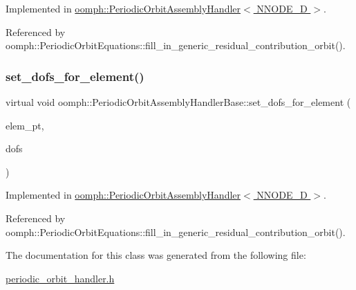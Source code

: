 Implemented in \hyperlink{classoomph_1_1PeriodicOrbitAssemblyHandler_a681a727dc0a463e924aa88e0e691e2c6}{oomph\+::\+Periodic\+Orbit\+Assembly\+Handler$<$ N\+N\+O\+D\+E\+\_\+D $>$}.



Referenced by oomph\+::\+Periodic\+Orbit\+Equations\+::fill\+\_\+in\+\_\+generic\+\_\+residual\+\_\+contribution\+\_\+orbit().

\mbox{\label{classoomph_1_1PeriodicOrbitAssemblyHandlerBase_a09d7c31dec8b9688cec82f8b24558b9b}} 
\subsubsection{\texorpdfstring{set\+\_\+dofs\+\_\+for\+\_\+element()}{set\_dofs\_for\_element()}}
{\footnotesize\ttfamily virtual void oomph\+::\+Periodic\+Orbit\+Assembly\+Handler\+Base\+::set\+\_\+dofs\+\_\+for\+\_\+element (\begin{DoxyParamCaption}\item[{\hyperlink{classoomph_1_1GeneralisedElement}{Generalised\+Element} $\ast$const}]{elem\+\_\+pt,  }\item[{\hyperlink{classoomph_1_1Vector}{Vector}$<$ double $>$ const \&}]{dofs }\end{DoxyParamCaption})\hspace{0.3cm}{\ttfamily [pure virtual]}}



Implemented in \hyperlink{classoomph_1_1PeriodicOrbitAssemblyHandler_a3d1d9f709e983495dac3113b8e716843}{oomph\+::\+Periodic\+Orbit\+Assembly\+Handler$<$ N\+N\+O\+D\+E\+\_\+D $>$}.



Referenced by oomph\+::\+Periodic\+Orbit\+Equations\+::fill\+\_\+in\+\_\+generic\+\_\+residual\+\_\+contribution\+\_\+orbit().



The documentation for this class was generated from the following file\+:\begin{DoxyCompactItemize}
\item 
\hyperlink{periodic__orbit__handler_8h}{periodic\+\_\+orbit\+\_\+handler.\+h}\end{DoxyCompactItemize}
